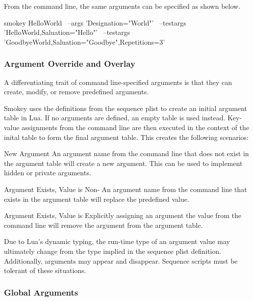 From the command line, the same arguments can be specified as shown below.

\begin{CommandLine}
smokey HelloWorld \
	--args 'Designation="World"' \
	--testargs 'HelloWorld,Saluation="Hello"' \
	--testargs 'GoodbyeWorld,Saluation="Goodbye",Repetitions=3'
\end{CommandLine}

\subsubsection{Argument Override and Overlay}

A differentiating trait of command line-specified arguments is that they can
create, modify, or remove predefined arguments.

Smokey uses the definitions from the sequence plist to create an initial
argument table in Lua.  If no arguments are defined, an empty table is used
instead.  Key-value assignments from the command line are then executed in the
context of the inital table to form the final argument table.  This creates the
following scenarios:

\begin{Descriptive}

	\item[New Argument] An argument name from the command line that does
	not exist in the argument table will create a new argument.  This can
	be used to implement hidden or private arguments.

	\item[Argument Exists, Value is Non-\keyword{nil}] An argument name
	from the command line that exists in the argument table will replace
	the predefined value.

	\item[Argument Exists, Value is ] Explicitly assigning an
	argument the value \keyword{nil} from the command line will remove the
	argument from the argument table.

\end{Descriptive}

Due to Lua's dynamic typing, the run-time type of an argument value may
ultimately change from the type implied in the sequence plist definition.
Additionally, arguments may appear and disappear.  Sequence scripts must be
tolerant of these situations.

\subsubsection{Global Arguments}

